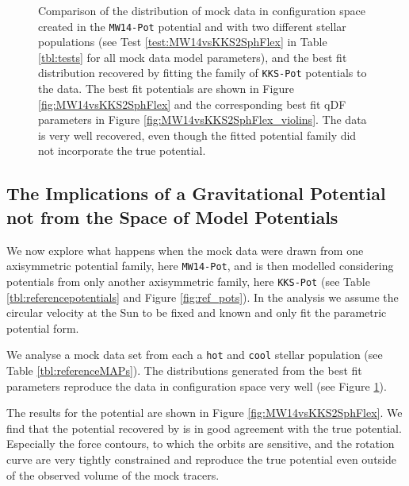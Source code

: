 \begin{figure}[!htbp]
\caption{Comparison of the distribution of mock data in configuration space created in the \texttt{MW14-Pot} potential and with two different stellar populations (see Test \ref{test:MW14vsKKS2SphFlex} in Table \ref{tbl:tests} for all mock data model parameters), and the best fit distribution recovered by fitting the family of \texttt{KKS-Pot} potentials to the data. The best fit potentials are shown in Figure \ref{fig:MW14vsKKS2SphFlex} and the corresponding best fit qDF parameters in Figure \ref{fig:MW14vsKKS2SphFlex_violins}. The data is very well recovered, even though the fitted potential family did not incorporate the true potential.}
\label{fig:MW14vsKKS2SphFlex_mockdata_residuals}
\end{figure}





\subsection{The Implications of a Gravitational Potential not from the Space of Model Potentials} \label{sec:results_potential}


We now explore what happens when the mock data were drawn from one axisymmetric potential family, here \texttt{MW14-Pot}, and is then modelled considering potentials from only another axisymmetric family, here \texttt{KKS-Pot} (see Table \ref{tbl:referencepotentials} and Figure \ref{fig:ref_pots}). In the analysis we assume the circular velocity at the Sun to be fixed and known  and only fit the parametric potential form. 





We analyse a mock data set from each a \texttt{hot} and \texttt{cool} stellar population (see Table \ref{tbl:referenceMAPs}). The distributions generated from the best fit parameters reproduce the data in configuration space very well (see Figure \ref{fig:MW14vsKKS2SphFlex_mockdata_residuals}).

The results for the potential are shown in Figure \ref{fig:MW14vsKKS2SphFlex}. We find that the potential recovered by \RM{} is in good agreement with the true potential. Especially the force contours, to which the orbits are sensitive, and the rotation curve are very tightly constrained and reproduce the true potential even outside of the observed volume of the mock tracers.

